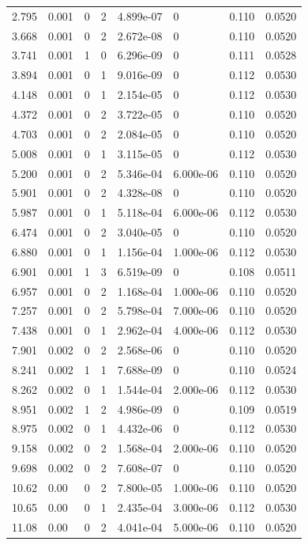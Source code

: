 \documentclass[preview]{standalone}
\begin{document}
{{\begin{tabular}{L{1.2cm}C{1.2cm} C{0.3cm}C{0.5cm} C{1.4cm}C{1.4cm} C{1.4cm}C{1.4cm}}
  2.795  &  0.001  & 0     &  2 &  4.899e-07  & 0  & 0.110 &  0.0520   \\ 
  3.668  &  0.001  & 0     &  2 &  2.672e-08  & 0  & 0.110 &  0.0520   \\ 
  3.741  &  0.001  & 1     &  0 &  6.296e-09  & 0  & 0.111 &  0.0528   \\ 
  3.894  &  0.001  & 0     &  1 &  9.016e-09  & 0  & 0.112 &  0.0530   \\ 
  4.148  &  0.001  & 0     &  1 &  2.154e-05  & 0  & 0.112 &  0.0530   \\ 
  4.372  &  0.001  & 0     &  2 &  3.722e-05  & 0  & 0.110 &  0.0520   \\ 
  4.703  &  0.001  & 0     &  2 &  2.084e-05  & 0  & 0.110 &  0.0520   \\ 
  5.008  &  0.001  & 0     &  1 &  3.115e-05  & 0  & 0.112 &  0.0530   \\ 
  5.200  &  0.001  & 0     &  2 &  5.346e-04  & 6.000e-06  & 0.110 &  0.0520   \\ 
  5.901  &  0.001  & 0     &  2 &  4.328e-08  & 0  & 0.110 &  0.0520   \\ 
  5.987  &  0.001  & 0     &  1 &  5.118e-04  & 6.000e-06  & 0.112 &  0.0530   \\ 
  6.474  &  0.001  & 0     &  2 &  3.040e-05  & 0  & 0.110 &  0.0520   \\ 
  6.880  &  0.001  & 0     &  1 &  1.156e-04  & 1.000e-06  & 0.112 &  0.0530   \\ 
  6.901  &  0.001  & 1     &  3 &  6.519e-09  & 0  & 0.108 &  0.0511   \\ 
  6.957  &  0.001  & 0     &  2 &  1.168e-04  & 1.000e-06  & 0.110 &  0.0520   \\ 
  7.257  &  0.001  & 0     &  2 &  5.798e-04  & 7.000e-06  & 0.110 &  0.0520   \\ 
  7.438  &  0.001  & 0     &  1 &  2.962e-04  & 4.000e-06  & 0.112 &  0.0530   \\ 
  7.901  &  0.002  & 0     &  2 &  2.568e-06  & 0  & 0.110 &  0.0520   \\ 
  8.241  &  0.002  & 1     &  1 &  7.688e-09  & 0  & 0.110 &  0.0524   \\ 
  8.262  &  0.002  & 0     &  1 &  1.544e-04  & 2.000e-06  & 0.112 &  0.0530   \\ 
  8.951  &  0.002  & 1     &  2 &  4.986e-09  & 0  & 0.109 &  0.0519   \\ 
  8.975  &  0.002  & 0     &  1 &  4.432e-06  & 0  & 0.112 &  0.0530   \\ 
  9.158  &  0.002  & 0     &  2 &  1.568e-04  & 2.000e-06  & 0.110 &  0.0520   \\ 
  9.698  &  0.002  & 0     &  2 &  7.608e-07  & 0  & 0.110 &  0.0520   \\ 
  10.62  &  0.00  & 0     &  2 &  7.800e-05  & 1.000e-06  & 0.110 &  0.0520   \\ 
  10.65  &  0.00  & 0     &  1 &  2.435e-04  & 3.000e-06  & 0.112 &  0.0530   \\ 
  11.08  &  0.00  & 0     &  2 &  4.041e-04  & 5.000e-06  & 0.110 &  0.0520   \\ 
\hline 
\end{tabular} 

}}
\end{document}
